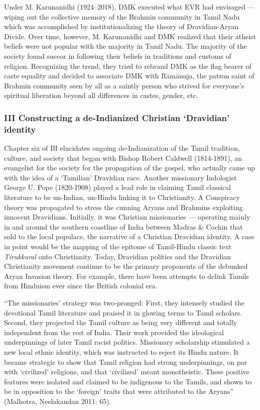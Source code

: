 Under M. Karunanidhi (1924–2018), DMK executed what EVR had envisaged — wiping out the collective memory of the Brahmin community in Tamil Nadu which was accomplished by institutionalizing the theory of Dravidian-Aryan Divide. Over time, however, M. Karunanidhi and DMK realized that their atheist beliefs were not popular with the majority in Tamil Nadu. The majority of the society found succor in following their beliefs in traditions and customs of religion. Recognizing the trend, they tried to rebrand DMK as the flag bearer of caste equality and decided to associate DMK with Rāmānuja, the patron saint of Brahmin community seen by all as a saintly person who strived for everyone’s spiritual liberation beyond all differences in castes, gender, etc.


\subsubsection*{III Constructing a de-Indianized Christian ‘Dravidian’ identity }

Chapter six of BI elucidates ongoing de-Indianization of the Tamil tradition, culture, and society that began with Bishop Robert Caldwell (1814-1891), an evangelist for the society for the propagation of the gospel, who actually came up with the idea of a ‘Tamilian’ Dravidian race. Another missionary Indologist George U. Pope (1820-1908) played a lead role in claiming Tamil classical literature to be un-Indian, un-Hindu linking it to Christianity. A Conspiracy theory was propagated to stress the cunning Aryans and Brahmins exploiting innocent Dravidians. Initially, it was Christian missionaries — operating mainly in and around the southern coastline of India between Madras \& Cochin that sold to the local populace, the narrative of a Christian Dravidian identity. A case in point would be the mapping of the epitome of Tamil-Hindu classic text \textit{Tirukkural} onto Christianity. Today, Dravidian politics and the Dravidian Christianity movement continue to be the primary proponents of the debunked Aryan Invasion theory. For example, there have been attempts to delink Tamils from Hinduism ever since the British colonial era.

\begin{myquote}
“The missionaries’ strategy was two-pronged: First, they intensely studied the devotional Tamil literature and praised it in glowing terms to Tamil scholars. Second, they projected the Tamil culture as being very different and totally independent from the rest of India. Their work provided the ideological underpinnings of later Tamil racist politics. Missionary scholarship stimulated a new local ethnic identity, which was instructed to reject its Hindu nature. It became strategic to show that Tamil religion had strong underpinnings, on par with ‘civilized’ religions, and that ‘civilized’ meant monotheistic. These positive features were isolated and claimed to be indigenous to the Tamils, and shown to be in opposition to the ‘foreign’ traits that were attributed to the Aryans” (Malhotra, Neelakandan 2011: 65).
\end{myquote}


